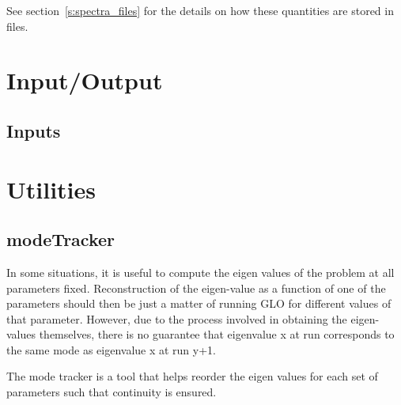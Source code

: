 \documentclass[a4paper,10pt]{book}
\begin{document}
See section~\ref{s:spectra_files} for the details on how these quantities are
stored in files.

\chapter{Input/Output}

\section{Inputs}
\label{s:inputs}

\appendix

\chapter{Utilities}
\section{modeTracker}
\label{util:modeTracker}
In some situations, it is useful to compute the eigen values of the problem at
all parameters fixed. Reconstruction of the eigen-value as a function of one of
the parameters should then be just a matter of running GLO for different values
of that parameter. However, due to the process involved in obtaining the
eigen-values themselves, there is no guarantee that eigenvalue x at run
corresponds to the same mode as eigenvalue x at run y+1.

The mode tracker is a tool that helps reorder the eigen values for each set of
parameters such that continuity is ensured.



\end{document}
